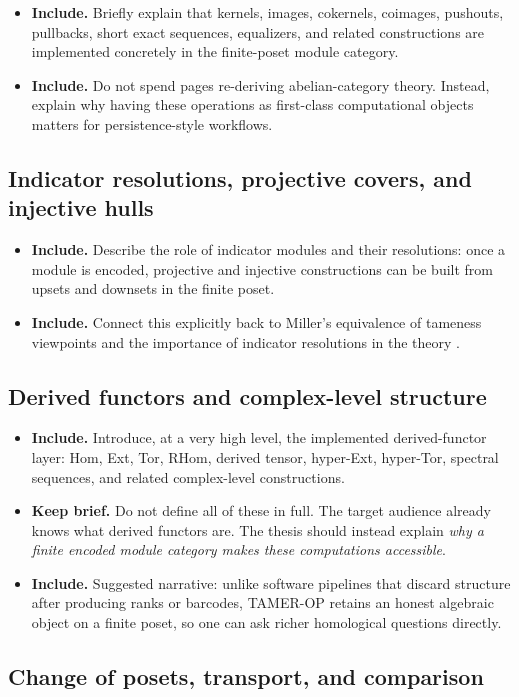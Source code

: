 \documentclass[11pt]{article}
\newcommand{\TAMER}{\textsc{TAMER-OP}}
\newenvironment{plan}{\begin{itemize}[leftmargin=1.6em,itemsep=0.35em,topsep=0.25em]}{\end{itemize}}
\newcommand{\includeitems}[1]{\item \textbf{Include.} #1}
\newcommand{\keepbrief}[1]{\item \textbf{Keep brief.} #1}
\begin{document}
\begin{plan}
    \includeitems{Briefly explain that kernels, images, cokernels, coimages, pushouts, pullbacks, short exact sequences, equalizers, and related constructions are implemented concretely in the finite-poset module category.}
    \includeitems{Do not spend pages re-deriving abelian-category theory. Instead, explain why having these operations as first-class computational objects matters for persistence-style workflows.}
\end{plan}

\subsection{Indicator resolutions, projective covers, and injective hulls}

\begin{plan}
    \includeitems{Describe the role of indicator modules and their resolutions: once a module is encoded, projective and injective constructions can be built from upsets and downsets in the finite poset.}
    \includeitems{Connect this explicitly back to Miller's equivalence of tameness viewpoints and the importance of indicator resolutions in the theory \cite{Mil20}.}
\end{plan}

\subsection{Derived functors and complex-level structure}

\begin{plan}
    \includeitems{Introduce, at a very high level, the implemented derived-functor layer: Hom, Ext, Tor, RHom, derived tensor, hyper-Ext, hyper-Tor, spectral sequences, and related complex-level constructions.}
    \keepbrief{Do not define all of these in full. The target audience already knows what derived functors are. The thesis should instead explain \emph{why a finite encoded module category makes these computations accessible}.}
    \includeitems{Suggested narrative: unlike software pipelines that discard structure after producing ranks or barcodes, \TAMER{} retains an honest algebraic object on a finite poset, so one can ask richer homological questions directly.}
\end{plan}

\subsection{Change of posets, transport, and comparison}
\end{document}

